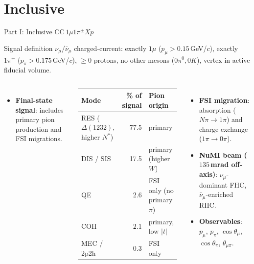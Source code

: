 \documentclass[aspectratio=169,10pt]{beamer}
\begin{document}
\section{Inclusive}
\begin{frame}{Part I: Inclusive CC$\,1\mu1\pi^{\pm}Xp$}
  \begin{block}{Signal definition}
    $\nu_\mu/\bar\nu_\mu$ charged-current: exactly $1\mu$ ($p_\mu>0.15$\,GeV/$c$), exactly $1\pi^\pm$ ($p_\pi>0.175$\,GeV/$c$), $\ge0$ protons, no other mesons ($0\pi^0, 0K$), vertex in active fiducial volume.
  \end{block}
  \begin{columns}[T]
  \begin{itemize}\scriptsize
    \item \textbf{Final-state signal}: includes primary pion production and FSI migrations.
  \end{itemize}
  \vspace{-1mm}
  \begin{center}\scriptsize\setlength{\tabcolsep}{3pt}
  \begin{tabular}{lrl}
  \toprule
  Mode & \% of signal & Pion origin\\\midrule
  RES ($\Delta(1232)$, higher $N^\ast$) & 77.5 & primary\\
  DIS / SIS                             & 17.5 & primary (higher $W$)\\
  QE                                    & 2.6  & \alert{FSI only} (no primary $\pi$)\\
  COH                                   & 2.1  & primary, low $|t|$\\
  MEC / 2p2h                            & 0.3  & \alert{FSI only}\\
  \bottomrule
  \end{tabular}
  \end{center}
  \vspace{-1mm}
  \begin{itemize}\scriptsize\setlength\itemsep{1.5pt}
    \item \textbf{FSI migration}: absorption ($N\pi \to 1\pi$) and charge exchange ($1\pi \to 0\pi$).
    \item \textbf{NuMI beam ($135$\,mrad off-axis)}: $\nu_\mu$-dominant FHC, $\bar\nu_\mu$-enriched RHC.
    \item \textbf{Observables}: $p_\mu$, $p_\pi$, $\cos\theta_\mu$, $\cos\theta_\pi$, $\theta_{\mu\pi}$.
  \end{itemize}

\end{columns}
\end{frame}
\end{document}
